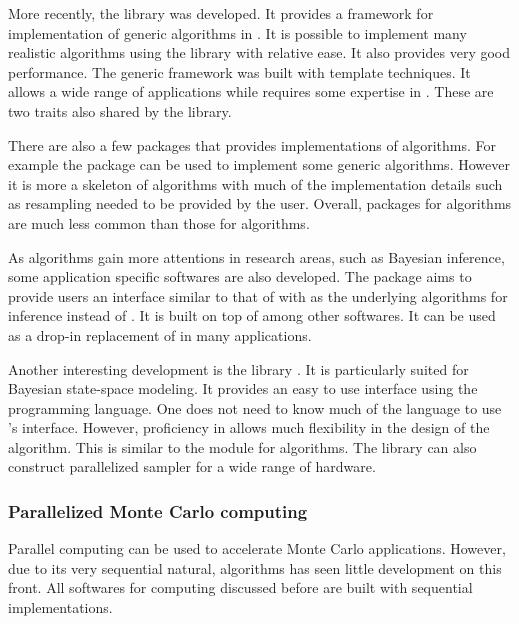 More recently, the \smctc library \cite{smctc} was developed. It provides a
framework for implementation of generic \smc algorithms in \cpp. It is
possible to implement many realistic algorithms using the library with
relative ease. It also provides very good performance. The generic framework
was built with \cpp template techniques. It allows a wide range of
applications while requires some expertise in \cpp. These are two traits also
shared by the \vsmc library.

There are also a few \rlang packages that provides implementations of \smc
algorithms. For example the \rsmc \cite{rsmc} package can be used to implement
some generic \smc algorithms. However it is more a skeleton of \smc algorithms
with much of the implementation details such as resampling needed to be
provided by the user. Overall, \rlang packages for \smc algorithms are much
less common than those for \mcmc algorithms.

As \smc algorithms gain more attentions in research areas, such as Bayesian
inference, some application specific softwares are also developed. The \biips
\cite{biips} package aims to provide users an interface similar to that of
\bugs with \smc as the underlying algorithms for inference instead of \mcmc.
It is built on top of \smctc among other softwares. It can be used as a
drop-in replacement of \bugs in many applications.

Another interesting development is the \libbi library \cite{libbi}. It is
particularly suited for Bayesian state-space modeling. It provides an easy to
use interface using the \perl programming language. One does not need to know
much of the language to use \libbi's interface. However, proficiency in \perl
allows much flexibility in the design of the algorithm. This is similar to the
\pymc module for \mcmc algorithms. The library can also construct parallelized
sampler for a wide range of hardware.

\subsubsection{Parallelized Monte Carlo computing}
\label{ssub:Parallelized Monte Carlo computing}

Parallel computing can be used to accelerate Monte Carlo applications.
However, due to its very sequential natural, \mcmc algorithms has seen little
development on this front. All softwares for \mcmc computing discussed before
are built with sequential implementations.

